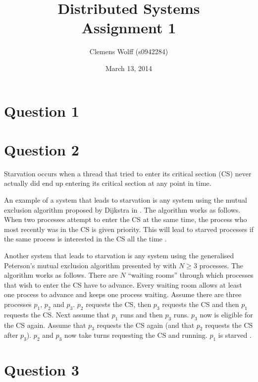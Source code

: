 \documentclass[a4paper,onecolumn,oneside]{article}
\title{Distributed Systems\\Assignment 1}
\author{Clemens Wolff (s0942284)}
\date{March 13, 2014}
\begin{document}
\maketitle

\section*{Question 1}
\section*{Question 2}

Starvation occurs when a thread that tried to enter its critical section (CS)
never actually did end up entering its critical section at any point in time.

An example of a system that leads to starvation is any system using the mutual
exclusion algorithm proposed by Dijkstra in \cite{dijkstra2001}.  The algorithm
works as follows.  When two processes attempt to enter the CS at the same time,
the process who most recently was in the CS is given priority.  This will lead
to starved processes if the same process is interested in the CS all the time
\cite[Theorem~5.1]{alagarsamy2003}.

Another system that leads to starvation is any system using the generalised
Peterson's mutual exclusion algorithm presented by \cite{hofri1990} with $N \geq
3$ processes.  The algorithm works as follows.  There are $N$ ``waiting rooms''
through which processes that wish to enter the CS have to advance.  Every
waiting room allows at least one process to advance and keeps one process
waiting. Assume there are three processes $p_1$, $p_2$ and $p_3$.  $p_2$
requests the CS, then $p_3$ requests the CS and then $p_1$ requests the CS.
Next assume that $p_1$ runs and then $p_3$ runs. $p_3$ now is eligible for the
CS again.  Assume that $p_3$ requests the CS again (and that $p_2$ requests the
CS after $p_3$).  $p_2$ and $p_3$ now take turns requesting the CS and running.
$p_1$ is starved \cite[Figure~1]{griffault2014}.

\section*{Question 3}
\end{document}
